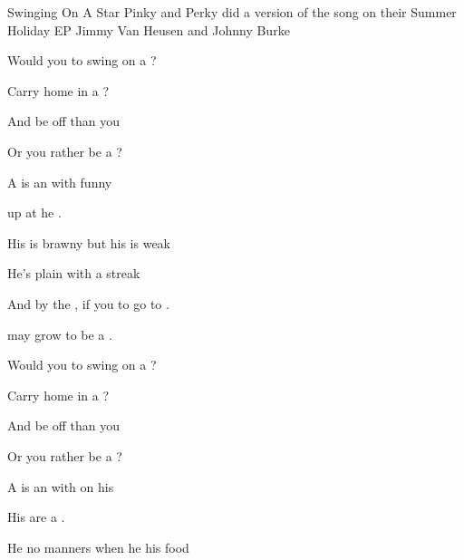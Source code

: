 \begin{SBSong}{Swinging On A Star}
  {Pinky and Perky did a version of the song on their Summer Holiday EP}
  {Jimmy Van Heusen and Johnny Burke}
  \begin{SBChorus}
    Would you  to swing on a ?
    
    Carry  home in a ?
    
    And be  off than you 
    
    Or  you rather be a ?
  \end{SBChorus}
  \begin{SBVerse}
    A  is an  with  funny 
    
     up at  he .
    
    His  is brawny but his  is weak
    
    He's  plain  with a  streak
    
    And by the , if you  to go to . 
    
     may grow  to be a .
  \end{SBVerse}
  \begin{SBChorus}
    Would you  to swing on a ?
    
    Carry  home in a ?
    
    And be  off than you 
    
    Or  you rather be a ?
  \end{SBChorus}
  \begin{SBVerse}
    A  is an  with  on his 
    
    His  are a  .
    
    He  no manners when he  his food
    

\end{SBVerse}
\end{SBSong}
